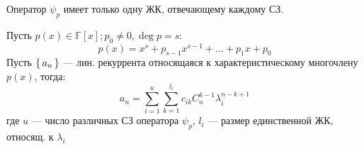 \begin{consequence}
    Оператор $\psi_p$ имеет только одну ЖК, отвечающему каждому СЗ.
\end{consequence}
\begin{theorem}
\label{theorem:07_3}
    Пусть $p(x) \in \mathbb{F}[x]; p_0 \neq 0, \deg p = s$:
    \[
    p(x) = x^{s} + p_{s - 1}x^{s - 1} + \ldots + p_1 x + p_0
    \]
    Пусть $\set{a_n}$ --- лин. рекуррента относящаяся к характеристическому многочлену $p(x)$, тогда:
    \[
    a_n = \sum_{i = 1}^{u} \sum_{k = 1}^{l_i} c_{ik} C_{n}^{k - 1} \lambda_i^{n - k + 1}
    \]
    где $u$ --- число различных СЗ оператора $\psi_p$, $l_i$ --- размер единственной ЖК, относящ. к $\lambda_i$ 
\end{theorem}
